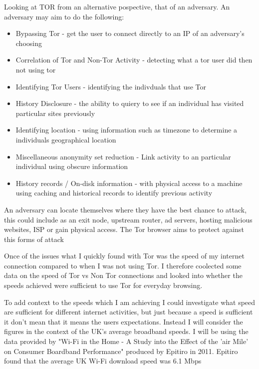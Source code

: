 \documentclass[12pt,a4paper,oneside]{article}
\begin{document}
Looking at TOR from an alternative pospective, that of an adversary. An adversary may aim to do the following:
\begin{itemize}
\item Bypassing Tor - get the user to connect directly to an IP of an adversary's choosing
\item Correlation of Tor and Non-Tor Activity - detecting what a tor user did then not using tor
\item Identifying Tor Users - identifying the indivduals that use Tor
\item History Disclosure - the ability to quiery to see if an individual has visited particular sites previously
\item Identifying location - using information such as timezone to determine a individuals geographical location
\item Miscellaneous anonymity set reduction - Link activity to an particular individual using obscure information
\item History records / On-disk information - with physical access to a machine using caching and historical records to identify previous activity
\end{itemize}

An adversary can locate themselves where they have the best chance to attack, this could include as an exit node, upstream router, ad servers, hosting malicious websites, ISP or gain physical access. The Tor browser aims to protect against this forms of attack 

Once of the issues what I quickly found with Tor was the speed of my internet connection compared to when I was not using Tor. I therefore coolected some data on the speed of Tor vs Non Tor connections and looked into whether the speeds achieved were sufficient to use Tor for everyday browsing.  

To add context to the speeds which I am achieving I could investigate what speed are sufficient for different internet activities, but just because a speed is sufficient it don't mean that it means the users expectations. Instead I will consider the figures in the context of the UK's average broadband speeds. I will be using the data provided by "Wi-Fi in the Home - A Study into the Effect of the 'air Mile' on Consumer Boardband Performance" produced by Epitiro in 2011. Epitiro found that the average UK Wi-Fi download speed was 6.1 Mbps
\end{document}
